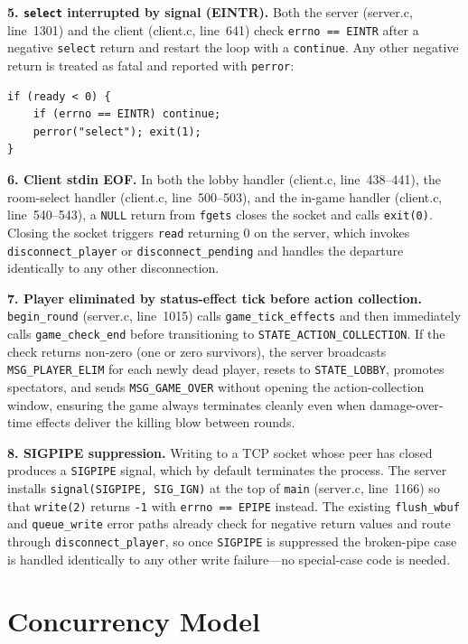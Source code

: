 \documentclass[11pt,letterpaper]{article}
\begin{document}
\textbf{5. \texttt{select} interrupted by signal (EINTR).} Both the server (server.c, line~1301) and the client (client.c, line~641) check \texttt{errno == EINTR} after a negative \texttt{select} return and restart the loop with a \texttt{continue}. Any other negative return is treated as fatal and reported with \texttt{perror}:
\begin{lstlisting}
if (ready < 0) {
    if (errno == EINTR) continue;
    perror("select"); exit(1);
}
\end{lstlisting}

\textbf{6. Client stdin EOF.} In both the lobby handler (client.c, line~438--441), the room-select handler (client.c, line~500--503), and the in-game handler (client.c, line~540--543), a \texttt{NULL} return from \texttt{fgets} closes the socket and calls \texttt{exit(0)}. Closing the socket triggers \texttt{read} returning 0 on the server, which invokes \texttt{disconnect\_player} or \texttt{disconnect\_pending} and handles the departure identically to any other disconnection.

\textbf{7. Player eliminated by status-effect tick before action collection.} \texttt{begin\_round} (server.c, line~1015) calls \texttt{game\_tick\_effects} and then immediately calls \texttt{game\_check\_end} before transitioning to \texttt{STATE\_ACTION\_COLLECTION}. If the check returns non-zero (one or zero survivors), the server broadcasts \texttt{MSG\_PLAYER\_ELIM} for each newly dead player, resets to \texttt{STATE\_LOBBY}, promotes spectators, and sends \texttt{MSG\_GAME\_OVER} without opening the action-collection window, ensuring the game always terminates cleanly even when damage-over-time effects deliver the killing blow between rounds.

\textbf{8. SIGPIPE suppression.} Writing to a TCP socket whose peer has closed produces a \texttt{SIGPIPE} signal, which by default terminates the process. The server installs \texttt{signal(SIGPIPE, SIG\_IGN)} at the top of \texttt{main} (server.c, line~1166) so that \texttt{write(2)} returns \texttt{-1} with \texttt{errno == EPIPE} instead. The existing \texttt{flush\_wbuf} and \texttt{queue\_write} error paths already check for negative return values and route through \texttt{disconnect\_player}, so once \texttt{SIGPIPE} is suppressed the broken-pipe case is handled identically to any other write failure---no special-case code is needed.
\newpage

\section{Concurrency Model}
\end{document}
